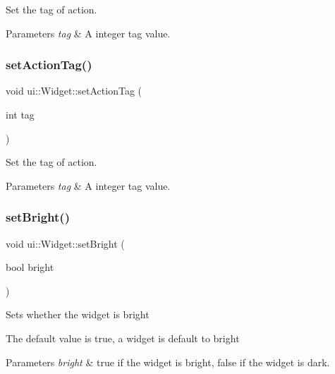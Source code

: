 Set the tag of action. 
\begin{DoxyParams}{Parameters}
{\em tag} & A integer tag value. \\
\hline
\end{DoxyParams}
\mbox{\label{classui_1_1Widget_a49aa79c6bdbcbb4d41d02e8d424826cb}} 
\subsubsection{\texorpdfstring{set\+Action\+Tag()}{setActionTag()}\hspace{0.1cm}{\footnotesize\ttfamily [2/2]}}
{\footnotesize\ttfamily void ui\+::\+Widget\+::set\+Action\+Tag (\begin{DoxyParamCaption}\item[{int}]{tag }\end{DoxyParamCaption})}

Set the tag of action. 
\begin{DoxyParams}{Parameters}
{\em tag} & A integer tag value. \\
\hline
\end{DoxyParams}
\mbox{\label{classui_1_1Widget_a70d4eaf022be75ac84d09782f4a68e76}} 
\subsubsection{\texorpdfstring{set\+Bright()}{setBright()}\hspace{0.1cm}{\footnotesize\ttfamily [1/2]}}
{\footnotesize\ttfamily void ui\+::\+Widget\+::set\+Bright (\begin{DoxyParamCaption}\item[{bool}]{bright }\end{DoxyParamCaption})}

Sets whether the widget is bright

The default value is true, a widget is default to bright


\begin{DoxyParams}{Parameters}
{\em bright} & true if the widget is bright, false if the widget is dark. \\
\hline
\end{DoxyParams}
\mbox{\label{classui_1_1Widget_a70d4eaf022be75ac84d09782f4a68e76}} 
